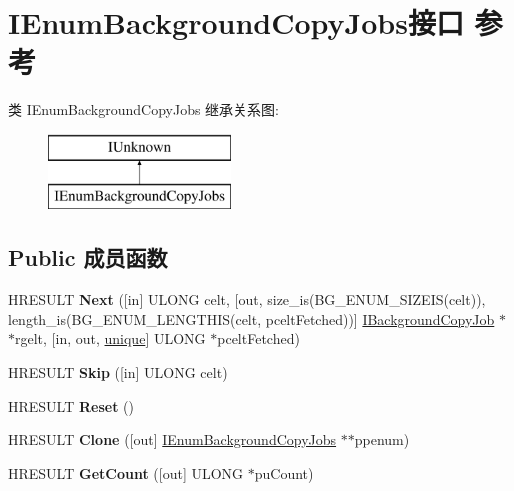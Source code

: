 \hypertarget{interface_i_enum_background_copy_jobs}{}\section{I\+Enum\+Background\+Copy\+Jobs接口 参考}
\label{interface_i_enum_background_copy_jobs}
类 I\+Enum\+Background\+Copy\+Jobs 继承关系图\+:\begin{figure}[H]
\begin{center}
\leavevmode
\includegraphics[height=2.000000cm]{interface_i_enum_background_copy_jobs}
\end{center}
\end{figure}
\subsection*{Public 成员函数}
\begin{DoxyCompactItemize}
\item 
\mbox{\label{interface_i_enum_background_copy_jobs_a09a95387972e5c50d0cb9f9706d3798a}} 
H\+R\+E\+S\+U\+LT {\bfseries Next} (\mbox{[}in\mbox{]} U\+L\+O\+NG celt, \mbox{[}out, size\+\_\+is(B\+G\+\_\+\+E\+N\+U\+M\+\_\+\+S\+I\+Z\+E\+IS(celt)), length\+\_\+is(B\+G\+\_\+\+E\+N\+U\+M\+\_\+\+L\+E\+N\+G\+T\+H\+IS(celt, pcelt\+Fetched))\mbox{]} \hyperlink{interface_i_background_copy_job}{I\+Background\+Copy\+Job} $\ast$$\ast$rgelt, \mbox{[}in, out, \hyperlink{interfaceunique}{unique}\mbox{]} U\+L\+O\+NG $\ast$pcelt\+Fetched)
\item 
\mbox{\label{interface_i_enum_background_copy_jobs_a8b4e418295d686e980c31e005e1647a5}} 
H\+R\+E\+S\+U\+LT {\bfseries Skip} (\mbox{[}in\mbox{]} U\+L\+O\+NG celt)
\item 
\mbox{\label{interface_i_enum_background_copy_jobs_aa05e7e74c43801f59fd6ab4975faceee}} 
H\+R\+E\+S\+U\+LT {\bfseries Reset} ()
\item 
\mbox{\label{interface_i_enum_background_copy_jobs_a960e62b02d3debe3d49f60799a5a4b78}} 
H\+R\+E\+S\+U\+LT {\bfseries Clone} (\mbox{[}out\mbox{]} \hyperlink{interface_i_enum_background_copy_jobs}{I\+Enum\+Background\+Copy\+Jobs} $\ast$$\ast$ppenum)
\item 
\mbox{\label{interface_i_enum_background_copy_jobs_a221373699525eaf9c88b7134110b8106}} 
H\+R\+E\+S\+U\+LT {\bfseries Get\+Count} (\mbox{[}out\mbox{]} U\+L\+O\+NG $\ast$pu\+Count)
\end{DoxyCompactItemize}
